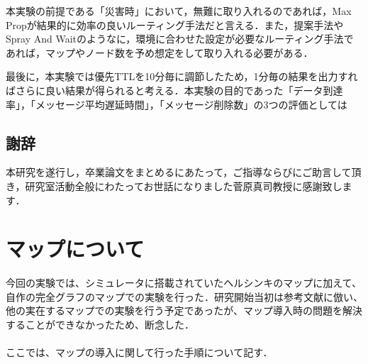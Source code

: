 \documentclass[11pt]{icsthesis}
\begin{document}
本実験の前提である「災害時」において，無難に取り入れるのであれば，Max Propが結果的に効率の良いルーティング手法だと言える．また，提案手法やSpray And Waitのようなに，環境に合わせた設定が必要なルーティング手法であれば，マップやノード数を予め想定をして取り入れる必要がある．

最後に，本実験では優先TTLを10分毎に調節したため，1分毎の結果を出力すればさらに良い結果が得られると考える．本実験の目的であった「データ到達率」，「メッセージ平均遅延時間」，「メッセージ削除数」の3つの評価としては


\clearpage
\fancyhead[L]{}\fancyhead[R]{}
\renewcommand{\headrulewidth}{0truemm}
\section*{謝辞}
本研究を遂行し，卒業論文をまとめるにあたって，ご指導ならびにご助言して頂き，研究室活動全般にわたってお世話になりました菅原真司教授に感謝致します．

\clearpage
\nocite{*}

\fancyhead[L]{\nouppercase{\small\leftmark}}\fancyhead[R]{}
\renewcommand{\headrulewidth}{0.3truemm}


\clearpage
\fancyhead[L]{\nouppercase{\small\leftmark}}
\fancyhead[R]{\nouppercase{\small\rightmark}}
\fancyfoot[C]{--\ \thepage\ --}
\renewcommand{\headrulewidth}{0.3truemm}
\appendix
\chapter{マップについて}
今回の実験では、シミュレータに搭載されていたヘルシンキのマップに加えて、自作の完全グラフのマップでの実験を行った．研究開始当初は参考文献に倣い、他の実在するマップでの実験を行う予定であったが、マップ導入時の問題を解決することができなかったため、断念した．\\\\
ここでは、マップの導入に関して行った手順について記す．
\end{document}
